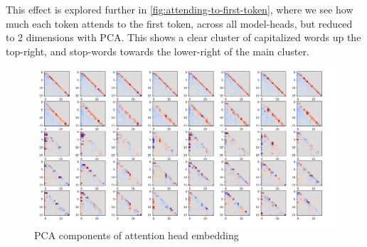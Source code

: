 \documentclass{article}
\begin{document}
This effect is explored further in \ref{fig:attending-to-first-token}, where we see how much each token attends to the first token, across all model-heads, but reduced to 2 dimensions with PCA. This shows a clear cluster of capitalized words up the top-right, and stop-words towards the lower-right of the main cluster.

\begin{figure}
    \includegraphics[width=\textwidth]{images/pca-components.png}
    \caption{PCA components of attention head embedding}
    \label{fig:pca-components}
\end{figure}
\end{document}
